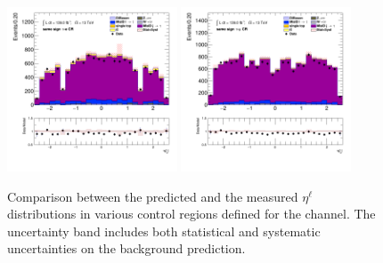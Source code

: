 \begin{figure}[!htp]
\begin{center}
			\includegraphics[width=0.45\textwidth]{chapters/chapter6_HPlus/images/taulep/lep_0_eta_SS_TAUEL.png} 
			\includegraphics[width=0.45\textwidth]{chapters/chapter6_HPlus/images/taulep/lep_0_eta_SS_TAUMU.png} \\
			\end{center}
			\caption{
			Comparison between the predicted and the measured $\eta^{\ell}$ distributions in various control regions defined for the \taulep channel. The uncertainty band includes both statistical and systematic uncertainties on the background prediction. 
			}
			\label{fig:bkg-eta-lep-taulep}
		\end{figure}

